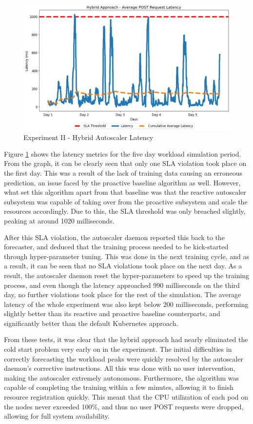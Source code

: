 \begin{figure}[htb]
    \centering
    \caption{Experiment II - Hybrid Autoscaler Latency}
    \label{fig:exp2-hybrid-k8s}
    \includegraphics[width=0.6\linewidth]{Figures/Compose-Post-Hybrid-Latency.png}
\end{figure}

Figure \ref{fig:exp2-hybrid-k8s} shows the latency metrics for the five day workload simulation period. From the graph, it can be clearly seen that only one SLA violation took place on the first day. This was a result of the lack of training data causing an erroneous prediction, an issue faced by the proactive baseline algorithm as well. However, what set this algorithm apart from that baseline was that the reactive autoscaler subsystem was capable of taking over from the proactive subsystem and scale the resources accordingly. Due to this, the SLA threshold was only breached slightly, peaking at around 1020 milliseconds.\par
After this SLA violation, the autoscaler daemon reported this back to the forecaster, and deduced that the training process needed to be kick-started through hyper-parameter tuning. This was done in the next training cycle, and as a result, it can be seen that no SLA violations took place on the next day. As a result, the autoscaler daemon reset the hyper-parameters to speed up the training process, and even though the latency approached 990 milliseconds on the third day, no further violations took place for the rest of the simulation. The average latency of the whole experiment was also kept below 200 milliseconds, performing slightly better than its reactive and proactive baseline counterparts, and significantly better than the default Kubernetes approach.\par

From these tests, it was clear that the hybrid approach had nearly eliminated the cold start problem very early on in the experiment. The initial difficulties in correctly forecasting the workload peaks were quickly resolved by the autoscaler daemon's corrective instructions. All this was done with no user intervention, making the autoscaler extremely autonomous. Furthermore, the algorithm was capable of completing the training within a few minutes, allowing it to finish resource registration quickly. This meant that the CPU utilization of each pod on the nodes never exceeded 100\%, and thus no user POST requests were dropped, allowing for full system availability.\par

